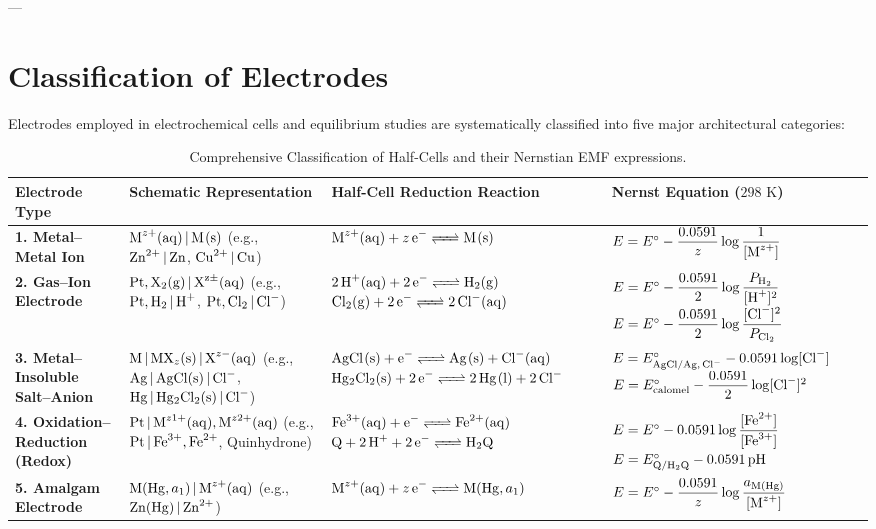 ---

\section{Classification of Electrodes}

Electrodes employed in electrochemical cells and equilibrium studies are systematically classified into five major architectural categories:

\begin{table}[htbp]
\centering
\small
\renewcommand{\arraystretch}{1.35}
\begin{tabularx}{\textwidth}{p{3.2cm} p{3.2cm} X p{3.5cm}}
\toprule
\textbf{Electrode Type} & \textbf{Schematic Representation} & \textbf{Half-Cell Reduction Reaction} & \textbf{Nernst Equation ($298\text{ K}$)} \\
\midrule
\textbf{1. Metal--Metal Ion} & $\ce{M^{z+}(aq) | M(s)}$ \newline (e.g., $\ce{Zn^2+ | Zn}$, $\ce{Cu^2+ | Cu}$) & $\ce{M^{z+}(aq) + z e^- <=> M(s)}$ & $E = E^\circ - \dfrac{0.0591}{z} \log \dfrac{1}{[\ce{M^{z+}}]}$ \\
\midrule
\textbf{2. Gas--Ion Electrode} & $\ce{Pt, X2(g) | X^{z\pm}(aq)}$ \newline (e.g., $\ce{Pt, H2 | H+}$, $\ce{Pt, Cl2 | Cl^-}$) & $\ce{2H+(aq) + 2e^- <=> H2(g)}$ \newline $\ce{Cl2(g) + 2e^- <=> 2Cl^-(aq)}$ & $E = E^\circ - \dfrac{0.0591}{2} \log \dfrac{P_{\ce{H2}}}{[\ce{H+}]^2}$ \newline $E = E^\circ - \dfrac{0.0591}{2} \log \dfrac{[\ce{Cl-}]^2}{P_{\ce{Cl2}}}$ \\
\midrule
\textbf{3. Metal--Insoluble Salt--Anion} & $\ce{M | MX_z(s) | X^{z-}(aq)}$ \newline (e.g., $\ce{Ag | AgCl(s) | Cl^-}$, $\ce{Hg | Hg2Cl2(s) | Cl^-}$) & $\ce{AgCl(s) + e^- <=> Ag(s) + Cl^-(aq)}$ \newline $\ce{Hg2Cl2(s) + 2e^- <=> 2Hg(l) + 2Cl^-}$ & $E = E^\circ_{\ce{AgCl/Ag,Cl-}} - 0.0591 \log [\ce{Cl-}]$ \newline $E = E^\circ_{\ce{calomel}} - \dfrac{0.0591}{2} \log [\ce{Cl-}]^2$ \\
\midrule
\textbf{4. Oxidation--Reduction (Redox)} & $\ce{Pt | M^{z1+}(aq), M^{z2+}(aq)}$ \newline (e.g., $\ce{Pt | Fe^3+, Fe^2+}$, Quinhydrone) & $\ce{Fe^3+(aq) + e^- <=> Fe^2+(aq)}$ \newline $\ce{Q + 2H+ + 2e^- <=> H2Q}$ & $E = E^\circ - 0.0591 \log \dfrac{[\ce{Fe^2+}]}{[\ce{Fe^3+}]}$ \newline $E = E^\circ_{\ce{Q/H2Q}} - 0.0591\,\text{pH}$ \\
\midrule
\textbf{5. Amalgam Electrode} & $\ce{M(Hg, } a_1\ce{) | M^{z+}(aq)}$ \newline (e.g., $\ce{Zn(Hg) | Zn^2+}$) & $\ce{M^{z+}(aq) + z e^- <=> M(Hg, } a_1\ce{)}$ & $E = E^\circ - \dfrac{0.0591}{z} \log \dfrac{a_{\ce{M(Hg)}}}{[\ce{M^{z+}}]}$ \\
\bottomrule
\end{tabularx}
\caption{Comprehensive Classification of Half-Cells and their Nernstian EMF expressions.}
\label{tab:electrode_classes}
\end{table}

